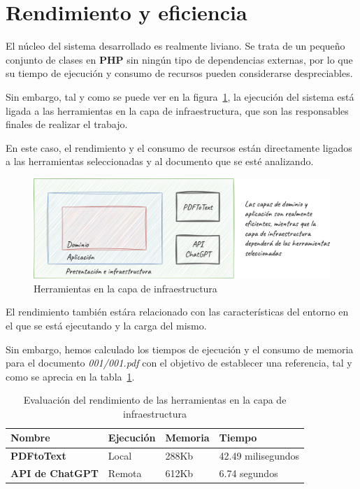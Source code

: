 \section{Rendimiento y eficiencia}

El núcleo del sistema desarrollado es realmente liviano.
Se trata de un pequeño conjunto de clases en \textbf{PHP} sin ningún tipo de dependencias externas, por lo que su
tiempo de ejecución y consumo de recursos pueden considerarse despreciables.

Sin embargo, tal y como se puede ver en la figura~\ref{fig:chapter_5.2.performance}, la ejecución del sistema está
ligada a las herramientas en la capa de infraestructura, que son las responsables finales de realizar el trabajo.

En este caso, el rendimiento y el consumo de recursos están directamente ligados a las herramientas seleccionadas y al
documento que se esté analizando.

\begin{figure}[ht]
    \begin{center}
        \includegraphics[width=\textwidth]{./chapter/5/images/chapter_5.2.performance}
        \caption{Herramientas en la capa de infraestructura}
        \label{fig:chapter_5.2.performance}
    \end{center}
\end{figure}

El rendimiento también estára relacionado con las características del entorno en el que se está ejecutando y la
carga del mismo.

Sin embargo, hemos calculado los tiempos de ejecución y el consumo de memoria para el documento \textit{001/001.pdf}
con el objetivo de establecer una referencia, tal y como se aprecia en la tabla~\ref{tab:execution_performance}.

\begin{table}[h]
    \renewcommand{\arraystretch}{1.5}
    \setlength{\tabcolsep}{10pt}
    \begin{tabular}{>{\bfseries}p{} p{} p{} p{}}
        \toprule
        \textbf{Nombre}         & \textbf{Ejecución} & \textbf{Memoria} & \textbf{Tiempo}    \\
        \midrule
        \textbf{PDFtoText}      & Local              & 288Kb            & 42.49 milisegundos \\
        API de \textbf{ChatGPT} & Remota             & 612Kb            & 6.74 segundos      \\
        \bottomrule
    \end{tabular}
    \caption{Evaluación del rendimiento de las herramientas en la capa de infraestructura}
    \label{tab:execution_performance}
\end{table}

